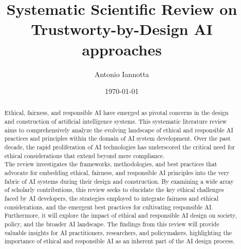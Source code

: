 \documentclass{article}
\title{Systematic Scientific Review on Trustworty-by-Design AI approaches}
\author{Antonio Iannotta}
\date{\today}
\begin{document}
\maketitle

\begin{abstract}
    Ethical, fairness, and responsible AI have emerged as pivotal concerns in the design and construction of artificial intelligence systems. This systematic literature review aims to comprehensively analyze the evolving landscape of ethical and responsible AI practices and principles within the domain of AI system development. Over the past decade, the rapid proliferation of AI technologies has underscored the critical need for ethical considerations that extend beyond mere compliance. \\
    The review investigates the frameworks, methodologies, and best practices that advocate for embedding ethical, fairness, and responsible AI principles into the very fabric of AI systems during their design and construction. By examining a wide array of scholarly contributions, this review seeks to elucidate the key ethical challenges faced by AI developers, the strategies employed to integrate fairness and ethical considerations, and the emergent best practices for cultivating responsible AI. \\
    Furthermore, it will explore the impact of ethical and responsible AI design on society, policy, and the broader AI landscape. The findings from this review will provide valuable insights for AI practitioners, researchers, and policymakers, highlighting the importance of ethical and responsible AI as an inherent part of the AI design process.
\end{abstract}
\newpage
\end{document}
